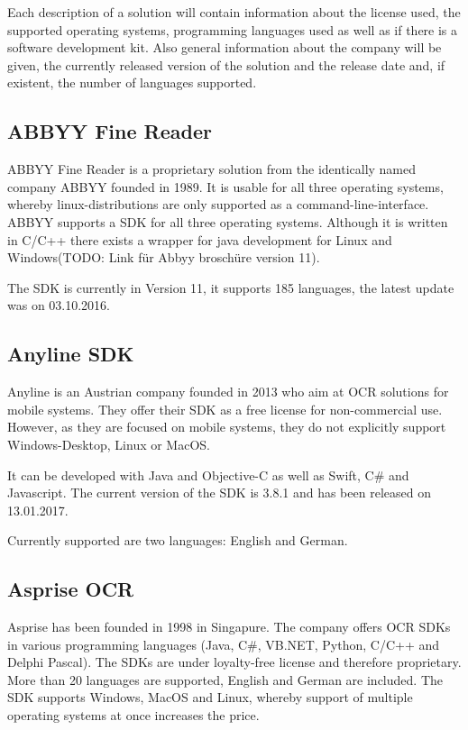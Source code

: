 Each description of a solution will contain information about the license used, the supported operating systems, programming languages used as well as if there is a software development kit. Also general information about the company will be given, the currently released version of the solution and the release date and, if existent, the number of languages supported.

\label{ABBYY}
\subsection{ABBYY Fine Reader}

ABBYY Fine Reader is a proprietary solution from the identically named company ABBYY founded in 1989. It is usable for all three operating systems, whereby linux-distributions are only supported as a command-line-interface. ABBYY supports a SDK for all three operating systems. Although it is written in C/C++ there exists a wrapper for java development for Linux and Windows(TODO: Link für Abbyy broschüre version 11). 

The SDK is currently in Version 11, it supports 185 languages, the latest update was on 03.10.2016.

\label{Anyline}
\subsection{Anyline SDK}

Anyline is an Austrian company founded in 2013 who aim at OCR solutions for mobile systems. They offer their SDK as a free license for non-commercial use. However, as they are focused on mobile systems, they do not explicitly support Windows-Desktop, Linux or MacOS.

It can be developed with Java and Objective-C as well as Swift, C\# and Javascript. The current version of the SDK is 3.8.1 and has been released on 13.01.2017.

Currently supported are two languages: English and German.

\label{Asprise}
\subsection{Asprise OCR}
Asprise has been founded in 1998 in Singapure. The company offers OCR SDKs in various programming languages (Java, C\#, VB.NET, Python, C/C++ and Delphi Pascal). The SDKs are under loyalty-free license and therefore proprietary. More than 20 languages are supported, English and German are included.
The SDK supports Windows, MacOS and Linux, whereby support of multiple operating systems at once increases the price.

